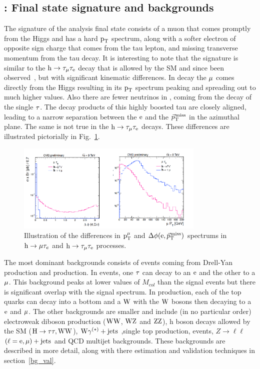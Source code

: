 \subsection{\hmue: Final state signature and backgrounds}
\label{h125_signature}
The signature of the \hmue analysis final state consists of a muon that comes promptly from the Higgs and has a hard $\text{p}_\text{T}$ spectrum, along with a softer electron of opposite sign charge that comes from the tau lepton, and missing transverse momentum from the tau decay. It is interesting to note that the signature is similar to the $\text{h} \to \tau_{\mu}\tau_{\text{e}}$ decay that is allowed by the SM and since been observed~\cite{}, but with significant kinematic differences. In \hmue decay the $\mu$ comes directly from the Higgs resulting in its $\text{p}_\text{T}$ spectrum peaking and spreading out to much higher values. Also there are fewer neutrinos in \hmue, coming from the decay of the single $\tau$. The decay products of this highly boosted tau are closely aligned, leading to a narrow separation between the $\text{e}$ and the ${\vec p}_{\mathrm{T}}^{\kern1pt\text{miss}}$ in the azimuthal plane. The same is not true in the $\text{h} \to \tau_{\mu}\tau_{\text{e}}$ decays. These differences are illustrated pictorially in Fig.~\ref{fig:htt_v_lfv}.






\begin{figure}
\begin{center}
\includegraphics[width=0.8\textwidth,keepaspectratio]{plots_and_figures/chapter5/htt_v_lfv.pdf}
\caption{Illustration of the differences in $\text{p}_\text{T}^{\mu}$ and $\Delta\phi(\text{e}, {\vec p}_{\mathrm{T}}^{\kern1pt\text{miss}})$ spectrums in $\text{h} \to \mu \tau_{e}$ and $\text{h} \to \tau_{\mu}\tau_{\text{e}}$ processes.}
\label{fig:htt_v_lfv}
\end{center}
\end{figure}

The most dominant backgrounds consists of \ztt events coming from Drell-Yan production and \ttb production. In \ztt events, one $\tau$ can decay to an $\text{e}$ and the other to a $\mu$. This background peaks at lower values of $M_{col}$ than the signal events but there is significant overlap with the signal spectrum. In \ttb production, each of the top quarks can decay into a bottom and a $\text{W}$ with the $\text{W}$ bosons then decaying to a $\text{e}$ and $\mu$. The other backgrounds are smaller and include (in no particular order) electroweak diboson production ($\text{W}\text{W}$, $\text{W}\text{Z}$ and $\text{Z}\text{Z}$), h boson decays allowed by the SM ($\text{H} \to \tau\tau,\text{W}\text{W}$), $\text{W}\gamma^{(*)}+\text{jets}$ ,single top production, \wjets events, $Z\to\ell\ell$ $(\ell = \text{e}, \mu)+\text{jets}$ and QCD multijet backgrounds. These backgrounds are described in more detail, along with there estimation and validation techniques in section~\ref{bg_val}.        


